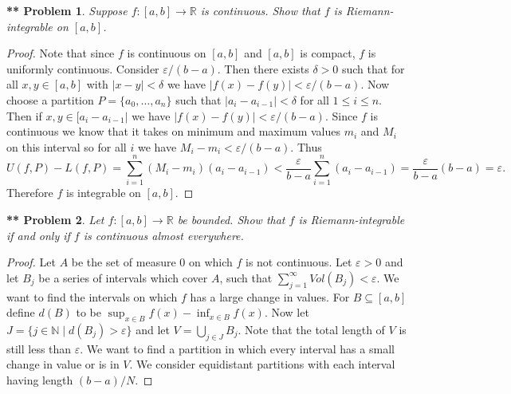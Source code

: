 \documentclass{article}
\newtheorem{**}{** Problem}
\begin{document}
\begin{flushleft}
\begin{**}
Suppose $f : [a,b] \rightarrow \mathbb{R}$ is continuous. Show that $f$ is Riemann-integrable on $[a,b]$.
\end{**}
\begin{proof}
Note that since $f$ is continuous on $[a,b]$ and $[a,b]$ is compact, $f$ is uniformly continuous. Consider $\varepsilon/(b-a)$. Then there exists $\delta > 0$ such that for all $x,y \in [a,b]$ with $|x-y| < \delta$ we have $|f(x) - f(y)| < \varepsilon/(b-a)$. Now choose a partition $P = \{a_0, \dots , a_n\}$ such that $|a_i-a_{i-1}| < \delta$ for all $1 \leq i \leq n$. Then if $x,y \in [a_i-a_{i-1}|$ we have $|f(x)-f(y)| < \varepsilon/(b-a)$. Since $f$ is continuous we know that it takes on minimum and maximum values $m_i$ and $M_i$ on this interval so for all $i$ we have $M_i-m_i < \varepsilon/(b-a)$. Thus
\[
U(f,P) - L(f,P) = \sum_{i=1}^{n} (M_i-m_i)(a_i-a_{i-1}) < \frac{\varepsilon}{b-a} \sum_{i=1}^{n} (a_i-a_{i-1}) = \frac{\varepsilon}{b-a}(b-a) = \varepsilon.
\]
Therefore $f$ is integrable on $[a,b]$.
\end{proof}

\begin{**}
Let $f : [a,b] \rightarrow \mathbb{R}$ be bounded. Show that $f$ is Riemann-integrable if and only if $f$ is continuous almost everywhere.
\end{**}
\begin{proof}
Let $A$ be the set of measure $0$ on which $f$ is not continuous. Let $\varepsilon > 0$ and let $B_j$ be a series of intervals which cover $A$, such that $\sum_{j=1}^{\infty} Vol(B_j) < \varepsilon$. We want to find the intervals on which $f$ has a large change in values. For $B \subseteq [a,b]$ define $d(B)$ to be $\sup_{x \in B} f(x) - \inf_{x \in B} f(x)$. Now let $J = \{j \in \mathbb{N} \mid d(B_j) > \varepsilon\}$ and let $V = \bigcup_{j \in J} B_j$. Note that the total length of $V$ is still less than $\varepsilon$. We want to find a partition in which every interval has a small change in value or is in $V$. We consider equidistant partitions with each interval having length $(b-a)/N$.\newline


\end{proof}
\end{flushleft}
\end{document}
